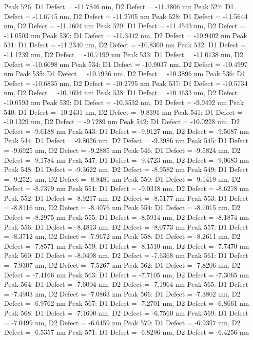 \documentclass{article}
\begin{document}
Peak 526: D1 Defect = -11.7846 nm, D2 Defect = -11.3806 nm
Peak 527: D1 Defect = -11.6745 nm, D2 Defect = -11.2705 nm
Peak 528: D1 Defect = -11.5644 nm, D2 Defect = -11.1604 nm
Peak 529: D1 Defect = -11.4543 nm, D2 Defect = -11.0503 nm
Peak 530: D1 Defect = -11.3442 nm, D2 Defect = -10.9402 nm
Peak 531: D1 Defect = -11.2340 nm, D2 Defect = -10.8300 nm
Peak 532: D1 Defect = -11.1239 nm, D2 Defect = -10.7199 nm
Peak 533: D1 Defect = -11.0138 nm, D2 Defect = -10.6098 nm
Peak 534: D1 Defect = -10.9037 nm, D2 Defect = -10.4997 nm
Peak 535: D1 Defect = -10.7936 nm, D2 Defect = -10.3896 nm
Peak 536: D1 Defect = -10.6835 nm, D2 Defect = -10.2795 nm
Peak 537: D1 Defect = -10.5734 nm, D2 Defect = -10.1694 nm
Peak 538: D1 Defect = -10.4633 nm, D2 Defect = -10.0593 nm
Peak 539: D1 Defect = -10.3532 nm, D2 Defect = -9.9492 nm
Peak 540: D1 Defect = -10.2431 nm, D2 Defect = -9.8391 nm
Peak 541: D1 Defect = -10.1329 nm, D2 Defect = -9.7289 nm
Peak 542: D1 Defect = -10.0228 nm, D2 Defect = -9.6188 nm
Peak 543: D1 Defect = -9.9127 nm, D2 Defect = -9.5087 nm
Peak 544: D1 Defect = -9.8026 nm, D2 Defect = -9.3986 nm
Peak 545: D1 Defect = -9.6925 nm, D2 Defect = -9.2885 nm
Peak 546: D1 Defect = -9.5824 nm, D2 Defect = -9.1784 nm
Peak 547: D1 Defect = -9.4723 nm, D2 Defect = -9.0683 nm
Peak 548: D1 Defect = -9.3622 nm, D2 Defect = -8.9582 nm
Peak 549: D1 Defect = -9.2521 nm, D2 Defect = -8.8481 nm
Peak 550: D1 Defect = -9.1419 nm, D2 Defect = -8.7379 nm
Peak 551: D1 Defect = -9.0318 nm, D2 Defect = -8.6278 nm
Peak 552: D1 Defect = -8.9217 nm, D2 Defect = -8.5177 nm
Peak 553: D1 Defect = -8.8116 nm, D2 Defect = -8.4076 nm
Peak 554: D1 Defect = -8.7015 nm, D2 Defect = -8.2975 nm
Peak 555: D1 Defect = -8.5914 nm, D2 Defect = -8.1874 nm
Peak 556: D1 Defect = -8.4813 nm, D2 Defect = -8.0773 nm
Peak 557: D1 Defect = -8.3712 nm, D2 Defect = -7.9672 nm
Peak 558: D1 Defect = -8.2611 nm, D2 Defect = -7.8571 nm
Peak 559: D1 Defect = -8.1510 nm, D2 Defect = -7.7470 nm
Peak 560: D1 Defect = -8.0408 nm, D2 Defect = -7.6368 nm
Peak 561: D1 Defect = -7.9307 nm, D2 Defect = -7.5267 nm
Peak 562: D1 Defect = -7.8206 nm, D2 Defect = -7.4166 nm
Peak 563: D1 Defect = -7.7105 nm, D2 Defect = -7.3065 nm
Peak 564: D1 Defect = -7.6004 nm, D2 Defect = -7.1964 nm
Peak 565: D1 Defect = -7.4903 nm, D2 Defect = -7.0863 nm
Peak 566: D1 Defect = -7.3802 nm, D2 Defect = -6.9762 nm
Peak 567: D1 Defect = -7.2701 nm, D2 Defect = -6.8661 nm
Peak 568: D1 Defect = -7.1600 nm, D2 Defect = -6.7560 nm
Peak 569: D1 Defect = -7.0499 nm, D2 Defect = -6.6459 nm
Peak 570: D1 Defect = -6.9397 nm, D2 Defect = -6.5357 nm
Peak 571: D1 Defect = -6.8296 nm, D2 Defect = -6.4256 nm
\end{document}
